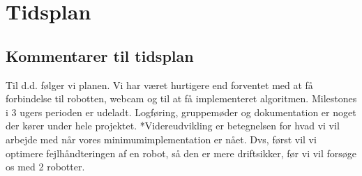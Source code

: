 \section{Tidsplan}

\clearpage
\subsection{Kommentarer til tidsplan}

Til d.d. følger vi planen. Vi har været hurtigere end forventet med at få forbindelse til robotten, webcam og til at få implementeret algoritmen.
Milestones i 3 ugers perioden er udeladt.
Logføring, gruppemøder og dokumentation er noget der kører under hele projektet.
*Videreudvikling er betegnelsen for hvad vi vil arbejde med når vores minimumimplementation er nået. Dvs, først vil vi optimere fejlhåndteringen af en robot, 
så den er mere driftsikker, før vi vil forsøge os med 2 robotter.